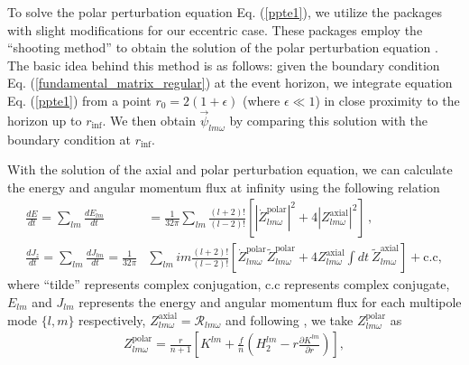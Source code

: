 \documentclass[11pt]{article}
\begin{document}
To solve the polar perturbation equation Eq. (\ref{ppte1}), we utilize the packages \cite{cardoso, maseli} with slight modifications for our eccentric case. These packages employ the ``shooting method'' to obtain the solution of the polar perturbation equation \cite{Berti:2009kk, Cardoso:2017njb, Cardoso:2008bp}. The basic idea behind this method is as follows: given the boundary condition Eq. (\ref{fundamental_matrix_regular}) at the event horizon, we integrate equation Eq. (\ref{ppte1}) from a point $r_0=2(1+\epsilon)$ (where $\epsilon\ll 1$) in close proximity to the horizon up to $r_{\textrm{inf}}$. We then obtain  $\vec\psi_{lm\omega}$ by comparing this solution with the boundary condition at $r_{\textrm{inf}}$.\par
%
With the solution of the axial and polar perturbation equation, we can calculate the energy and angular momentum flux at infinity using the following relation \cite{RevModPhys.52.299, PhysRevD.70.084044, PhysRevD.69.044025}
\begin{equation}\label{Flux_eqn}
\begin{aligned}
\frac{dE}{dt}=\sum_{lm}\frac{dE_{lm}}{dt}&=\frac{1}{32\pi}\sum_{lm}\frac{(l+2)!}{(l-2)!}\left[|\dot Z_{lm\omega}^{\textrm{polar}}|^2+4|Z_{lm\omega}^{\textrm{axial}}|^2\right]\,,\\
\frac{dJ_z}{dt}=\sum_{lm}\frac{dJ_{lm}}{dt}=\frac{1}{32\pi}&\sum_{lm}im\frac{(l+2)!}{(l-2)!}\left[\dot Z_{lm\omega}^{\textrm{polar}}\tilde Z_{lm\omega}^{\textrm{polar}}+4 Z_{lm\omega}^{\textrm{axial}}\int dt~\tilde Z_{lm\omega}^{\textrm{axial}}\right]+\textrm{c.c},
\end{aligned}
\end{equation}
where ``tilde'' represents complex conjugation, $\textrm{c.c}$ represents complex conjugate, $E_{lm}$ and $J_{lm}$ represents the energy and angular momentum flux for each multipole mode $\{l,m\}$ respectively, $Z_{lm\omega}^{\textrm{axial}}=\mathcal{R}_{lm\omega}$ and following \cite{Cardoso:2022whc}, we take $Z_{lm\omega}^{\textrm{polar}}$ as %
\begin{equation}\label{polar_master}
\begin{aligned}
Z_{lm\omega}^{\textrm{polar}}=\frac{r}{n+1}\left[K^{lm}+\frac{f}{n}\left(H^{lm}_2-r\frac{\partial K^{lm}}{\partial r}\right)\right],
\end{aligned}
\end{equation}
\end{document}
